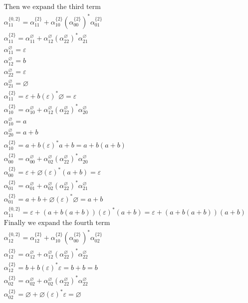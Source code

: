 \documentclass{article}
\newcommand{\es}{\varnothing}
\renewcommand{\epsilon}{\varepsilon}
\theoremstyle{definition}
\begin{document}
\begin{enumerate}
\begin{align*}
&\text{Then we expand the third term} \\
&\alpha_{11}^{\{0,2\}} = \alpha_{11}^{\{2\}}+\alpha_{10}^{\{2\}}\left(\alpha_{00}^{\{2\}}\right)^*\alpha_{01}^{\{2\}} \\
&\alpha_{11}^{\{2\}} = \alpha_{11}^{\es} + \alpha_{12}^{\es}\left(\alpha_{22}^{\es}\right)^*\alpha_{21}^{\es}\\
&\alpha_{11}^{\es} = \epsilon\\
&\alpha_{12}^{\es} = b \\
&\alpha_{22}^{\es} = \epsilon \\
&\alpha_{21}^{\es} = \es \\
&\alpha_{11}^{\{2\}} = \epsilon + b\left(\epsilon\right)^*\es = \epsilon\\
&\alpha_{10}^{\{2\}} = \alpha_{10}^{\es} + \alpha_{12}^{\es}\left(\alpha_{22}^{\es}\right)^*\alpha_{20}^{\es}\\
&\alpha_{10}^{\es} = a \\
&\alpha_{20}^{\es} = a + b \\
&\alpha_{10}^{\{2\}} = a + b\left(\epsilon\right)^*a+b = a + b(a+b) \\
&\alpha_{00}^{\{2\}} =  \alpha_{00}^{\es} + \alpha_{02}^{\es}\left(\alpha_{22}^{\es}\right)^*\alpha_{20}^{\es}\\
&\alpha_{00}^{\{2\}} = \epsilon + \es\left(\epsilon\right)^*(a+b) = \epsilon\\
&\alpha_{01}^{\{2\}}= \alpha_{01}^{\es} + \alpha_{02}^{\es}\left(\alpha_{22}^{\es}\right)^*\alpha_{21}^{\es}\\
&\alpha_{01}^{\{2\}} = a + b + \es\left(\epsilon\right)^*\es = a + b\\
&\alpha_{11}^{\{0,2\}} = \epsilon + (a+b(a+b))(\epsilon)^*(a+b) = \epsilon + (a+b(a+b))(a+b) \\
&\text{Finally we expand the fourth term} \\
&\alpha_{12}^{\{0,2\}} = \alpha_{12}^{\{2\}}+\alpha_{10}^{\{2\}}\left(\alpha_{00}^{\{2\}}\right)^*\alpha_{02}^{\{2\}} \\
&\alpha_{12}^{\{2\}} = \alpha_{12}^{\es} + \alpha_{12}^{\es}\left(\alpha_{22}^{\es}\right)^*\alpha_{22}^{\es}\\ 
&\alpha_{12}^{\{2\}} = b + b(\epsilon)^*\epsilon = b + b = b\\
&\alpha_{02}^{\{2\}} = \alpha_{02}^{\es} + \alpha_{02}^{\es}\left(\alpha_{22}^{\es}\right)^*\alpha_{22}^{\es}\\ 
&\alpha_{02}^{\{2\}} = \es + \es(\epsilon)^*\epsilon = \es \\

\end{align*}
\end{enumerate}
\end{document}
